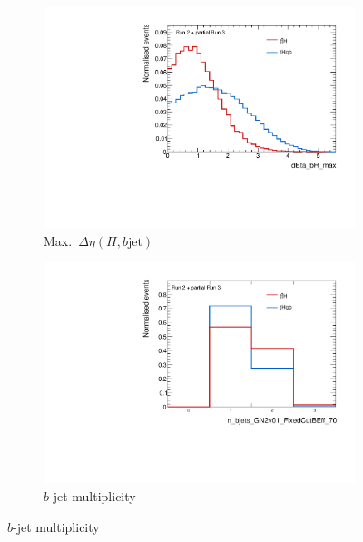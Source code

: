 \begin{figure}[htbp]
  \centering
  \begin{subfigure}[b]{0.45\textwidth}
    \centering
    \includegraphics[width=\textwidth]{images/plots_tH_tHqb_for_thesis/dEta_bH_max_signals_ATLAS.pdf}
    \caption{Max.\ $\Delta \eta (H,b\text{jet})$}
    \label{res:dEta_bH_max}
  \end{subfigure}
  \hfill
  \begin{subfigure}[b]{0.45\textwidth}
    \centering
    \includegraphics[width=\textwidth]{images/plots_tH_tHqb_for_thesis/n_bjets_GN2v01_FixedCutBEff_70_signals_ATLAS.pdf}
    \caption{$b$-jet multiplicity}
    \label{res:n_bjets}
  \end{subfigure}


\end{figure}
